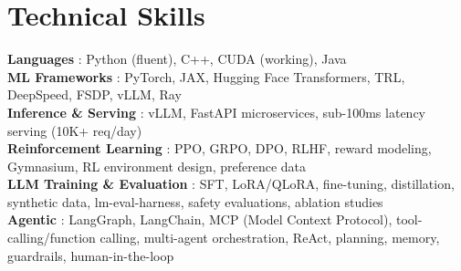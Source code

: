 \documentclass[letterpaper,10pt]{article}
\begin{document}
\section{Technical Skills}
\begin{itemize}[leftmargin=0.15in, itemsep=0pt, label={}]
  \small{\item{
        \textbf{Languages }{: Python (fluent), C++, CUDA (working), Java} \\
        \vspace{2pt}
        \textbf{ML Frameworks }{: PyTorch, JAX, Hugging Face Transformers, TRL, DeepSpeed, FSDP, vLLM, Ray} \\
        \vspace{2pt}
        \textbf{Inference \& Serving }{: vLLM, FastAPI microservices, sub-100ms latency serving (10K+ req/day)} \\
        \vspace{2pt}
        \textbf{Reinforcement Learning }{: PPO, GRPO, DPO, RLHF, reward modeling, Gymnasium, RL environment design, preference data} \\
        \vspace{2pt}
        \textbf{LLM Training \& Evaluation }{: SFT, LoRA/QLoRA, fine-tuning, distillation, synthetic data, lm-eval-harness, safety evaluations, ablation studies} \\
        \vspace{2pt}
        \textbf{Agentic }{: LangGraph, LangChain, MCP (Model Context Protocol), tool-calling/function calling, multi-agent orchestration, ReAct, planning, memory, guardrails, human-in-the-loop}
        }}
\end{itemize}
\end{document}
